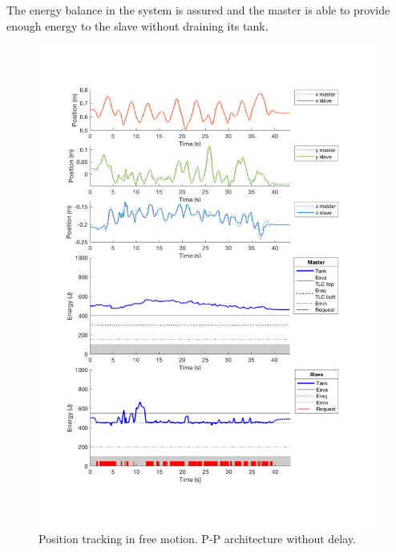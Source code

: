 The energy balance in the system is assured and the master is able to provide enough energy to the slave without draining its tank.
\begin{center}
	\begin{figure}
		\includegraphics[width=\textwidth, keepaspectratio]{plots/ppFree/Position.pdf}
		\caption{Position tracking in free motion. P-P architecture without delay.}
		\label{graph:ppFree/Position}
	\end{figure}
\end{center}
